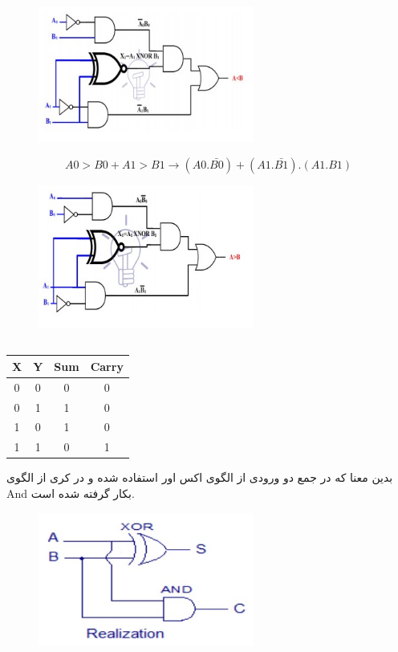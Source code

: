 \documentclass[20pt, a4paper]{article}
\begin{document}
\begin{figure}[htbp]\centering
	\centerline{\includegraphics[width=200pt]{img/lastest/2bitL.jpg}}
\end{figure}


\begin{equation}
	A0>B0 + A1>B1 \rightarrow (A0.\bar{B0})+(A1.\bar{B1}).(A1.B1)
\end{equation}

\begin{figure}[htbp]\centering
	\centerline{\includegraphics[width=200pt]{img/lastest/2bitG.jpg}}
\end{figure}

\subsection{}
\begin{LTR}
	\begin{tabular}{ c c | c | c }
		X & Y & Sum & Carry \\
		\hline
		0 & 0 & 0 & 0\\ 				
		0 & 1 & 1 & 0\\
		1 & 0 & 1 & 0\\
		1 & 1 & 0 & 1
	\end{tabular}
\end{LTR}
\hfill \break

بدین معنا که در جمع دو ورودی از الگوی اکس اور استفاده شده و در کری از الگوی And 
بکار گرفته شده است.
\begin{figure}[htbp]\centering
	\centerline{\includegraphics[width=200pt]{img/lastest/halfAdderPatternCircuit.jpg}}
\end{figure}
\end{document}
